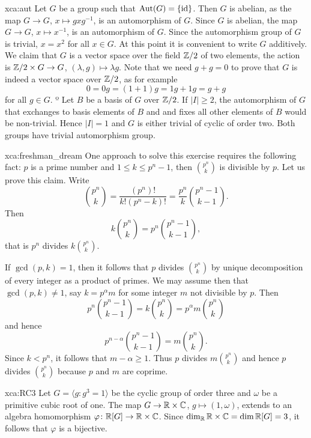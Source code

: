 \begin{sol}{xca:aut}
    Let $G$ be a group such that $\operatorname{Aut}(G)=\{\operatorname{id}\}$. 
    Then $G$ is abelian, as the map $G\to G$, $x\mapsto gxg^{-1}$,   
    is an automorphism of $G$. Since $G$ is abelian, 
    the map $G\to G$, $x\mapsto x^{-1}$, is an automorphism of $G$. Since 
    the automorphism group of $G$ is trivial, 
    $x=x^2$ for all $x\in G$. 
    At this point it is convenient to write $G$ additively. We claim that 
    $G$ is a vector space
    over the field $\mathbb{Z}/2$ of two elements, the action
    is $\mathbb{Z}/2\times G\to G$, $(\lambda,g)\mapsto \lambda g$. Note that
    we need $g+g=0$ to prove that $G$ is indeed a vector space over $\mathbb{Z}/2$, as for example
    \[
    0=0g=(1+1)g=1g+1g=g+g
    \]
    for all $g\in G$. º
    Let $B$ be   
    a basis of $G$ over $\mathbb{Z}/2$. If $|I|\geq 2$, 
    the automorphism of $G$ that exchanges to basis elements of $B$ and  
    and fixes all other elements of $B$ would be non-trivial. Hence $|I|=1$ and 
    $G$ is either trivial of cyclic of order two. Both groups have trivial
    automorphism group. 
\end{sol}


\begin{sol}{xca:freshman_dream}
    One approach to solve this exercise requires the following fact: 
    $p$ is a prime number and $1\leq k\leq p^n-1$, then $\binom{p^n}{k}$ is divisible by $p$.
    Let us prove this claim. Write
    \[
    \binom{p^n}{k}=\frac{(p^n)!}{k!(p^n-k)!}=\frac{p^n}{k}\binom{p^n-1}{k-1}.
    \]
    Then
    \[
    k\binom{p^n}{k}=p^n\binom{p^n-1}{k-1},
    \]
    that is $p^n$ divides $k\binom{p^n}{k}$. 
    
    If $\gcd(p,k)=1$, then it follows that $p$ divides $\binom{p^n}{k}$ by unique decomposition
    of every integer as a product of primes. We may assume then that $\gcd(p,k)\ne1$, 
    say $k=p^\alpha m$ for some integer $m$ not divisible by $p$. Then
    \[
    p^n\binom{p^n-1}{k-1}=k\binom{p^n}{k}=p^{\alpha}m\binom{p^n}{k}
    \]
    and hence 
    \[
    p^{n-\alpha}\binom{p^n-1}{k-1}=m\binom{p^n}{k}.
    \]
    Since $k<p^n$, it follows that
    $m-\alpha\geq 1$. Thus $p$ divides $m\binom{p^n}{k}$ and hence
    $p$ divides $\binom{p^n}{k}$ because $p$ and $m$ are coprime. 
\end{sol}


\begin{sol}{xca:RC3}
Let $G=\langle g:g^3=1\rangle$ be the cyclic group of order three and $\omega$ be a primitive cubic root of one.  
The map $G\to \mathbb{R}\times\mathbb{C}$, $g\mapsto (1,\omega)$, extends to an algebra
homomorphism $\varphi\colon\mathbb{R}[G]\to\mathbb{R}\times\mathbb{C}$. Since 
$\dim_{\mathbb{R}}\mathbb{R}\times\mathbb{C}=\dim\mathbb{R}[G]=3$, it follows that $\varphi$ is a bijective. 
\end{sol}


